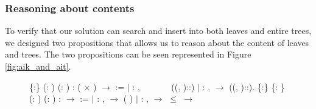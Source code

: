\subsubsection{Reasoning about contents}
To verify that our solution can search and insert into both leaves and entire trees, we designed two propositions that allows us to reason about the content of leaves and trees. The two propositions can be seen represented in Figure \ref{fig:aik_and_ait}. 

\begin{figure}
\begin{coqdoccode}
  \coqdocnoindent
    \{:\} (: ) (: ) :  ( \ensuremath{\times} ) \ensuremath{\rightarrow}  :=\coqdoceol
  \coqdocindent{1.00em}
  \ensuremath{|} : \coqdockw{\ensuremath{\forall}} , ~~~~~~   ((, )::)\coqdoceol
  \coqdocindent{1.00em}
  \ensuremath{|} : \coqdockw{\ensuremath{\forall}}   ,	    \ensuremath{\rightarrow} \coqdoceol
  \coqdocindent{11em}    ((, )::).\coqdoceol
  \coqdocemptyline
  \coqdocnoindent
    \{:\} \{: \} (: ) (: ) :    \ensuremath{\rightarrow}  :=\coqdoceol
  \coqdocindent{1.00em}
  \ensuremath{|} : \coqdockw{\ensuremath{\forall}} ,\coqdoceol
  \coqdocindent{8.00em}
      \ensuremath{\rightarrow} \coqdoceol
  \coqdocindent{8.00em}
     (   )\coqdoceol
  \coqdocindent{1.00em}
  \ensuremath{|} : \coqdockw{\ensuremath{\forall}}    , \coqdoceol
  \coqdocindent{8.00em}
      \ensuremath{\rightarrow}  \ensuremath{\le}  \ensuremath{\rightarrow}\coqdoceol

\end{coqdoccode}
\end{figure}
